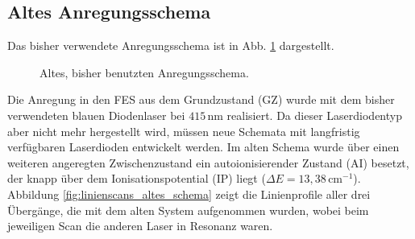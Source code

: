 \subsection{Altes Anregungsschema}\label{subsec:anregungsschema_alt}
Das bisher verwendete Anregungsschema ist in Abb.
\ref{fig:anregungsschema_alt} dargestellt.
\begin{figure}[h]
 	\centering
	\caption[Anregungsschema, alt]{Altes, bisher benutzten
	Anregungsschema.}
	\label{fig:anregungsschema_alt}
\end{figure}
Die Anregung in den FES aus dem Grundzustand (GZ) wurde mit
dem bisher verwendeten blauen Diodenlaser bei $415\,$nm realisiert. Da dieser
Laserdiodentyp aber nicht mehr hergestellt wird, müssen neue Schemata mit langfristig verfügbaren Laserdioden entwickelt
werden. Im alten Schema wurde über einen weiteren angeregten Zwischenzustand ein
autoionisierender Zustand (AI) besetzt, der knapp über dem Ionisationspotential (IP) liegt ($\Delta E=13,38\,$cm$^{-1}$).
Abbildung \ref{fig:linienscans_altes_schema} zeigt die Linienprofile aller drei
Übergänge, die mit dem alten System aufgenommen wurden, wobei beim jeweiligen Scan die anderen
Laser in Resonanz waren.

